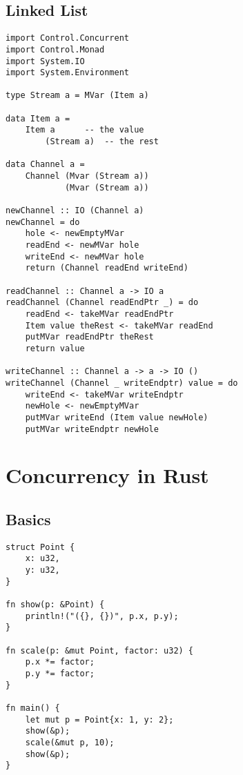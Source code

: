 \documentclass[twocolumn,landscape,10pt]{article}
\theoremstyle{definition}
\begin{document}
\subsection{Linked List}

\begin{lstlisting}[Haskell]
import Control.Concurrent
import Control.Monad
import System.IO
import System.Environment

type Stream a = MVar (Item a)

data Item a =
    Item a      -- the value
        (Stream a)  -- the rest

data Channel a =
    Channel (Mvar (Stream a))
            (Mvar (Stream a))

newChannel :: IO (Channel a)
newChannel = do
    hole <- newEmptyMVar
    readEnd <- newMVar hole
    writeEnd <- newMVar hole
    return (Channel readEnd writeEnd)

readChannel :: Channel a -> IO a
readChannel (Channel readEndPtr _) = do
    readEnd <- takeMVar readEndPtr
    Item value theRest <- takeMVar readEnd
    putMVar readEndPtr theRest
    return value

writeChannel :: Channel a -> a -> IO ()
writeChannel (Channel _ writeEndptr) value = do
    writeEnd <- takeMVar writeEndptr
    newHole <- newEmptyMVar
    putMVar writeEnd (Item value newHole)
    putMVar writeEndptr newHole
\end{lstlisting} 

\newpage
\section{Concurrency in Rust}

\subsection{Basics}
\begin{lstlisting}[Rust]
struct Point {
    x: u32,
    y: u32,
}

fn show(p: &Point) {
    println!("({}, {})", p.x, p.y);
}

fn scale(p: &mut Point, factor: u32) {
    p.x *= factor;
    p.y *= factor;
}

fn main() {
    let mut p = Point{x: 1, y: 2};
    show(&p);
    scale(&mut p, 10);
    show(&p);
}
\end{lstlisting} 
\end{document}
